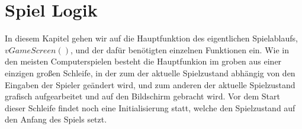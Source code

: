 
\chapter{Spiel Logik}
\label{Spiel_Logik}
%
In diesem Kapitel gehen wir auf die Hauptfunktion des eigentlichen Spielablaufs, $vGameScreen()$, und der daf{\"u}r ben{\"o}tigten einzelnen Funktionen ein. Wie in den meisten Computerspielen besteht die Hauptfunkion im groben aus einer einzigen gro{\ss}en Schleife, in der zum der aktuelle Spielzustand abh{\"a}ngig von den Eingaben der Spieler ge{\"a}ndert wird, und zum anderen der aktuelle Spielzustand grafisch aufgearbeitet und auf den Bildschirm gebracht wird. Vor dem Start dieser Schleife findet noch eine Initialisierung statt, welche den Spielzustand auf den Anfang des Spiels setzt.
%

